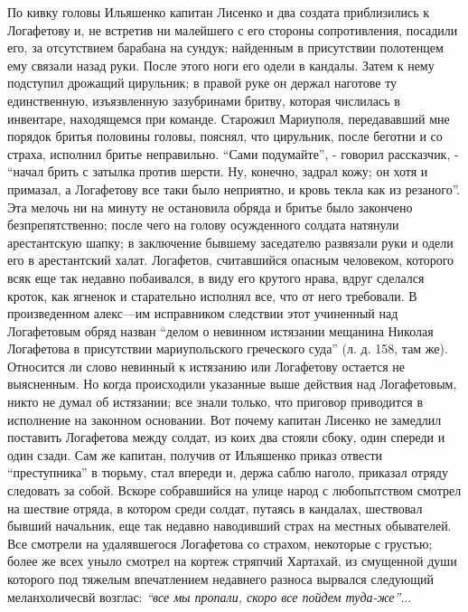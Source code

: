 \documentclass[a4paper,20pt]{report}
\begin{document}
По кивку головы Ильяшенко капитан Лисенко и два
создата приблизились к Логафетову и, не встретив ни
малейшего с его стороны сопротивления, посадили его, за
отсутствием барабана на сундук; найденным в присутствии полотенцем
ему связали назад руки. После этого
ноги его одели в кандалы. Затем к нему подступил
дрожащий цирульник; в правой руке он держал наготове 
ту единственную, изъязвленную зазубринами бритву,
которая числилась в инвентаре, находящемся при команде.
Старожил Мариуполя, передававший мне порядок бритья
половины головы, пояснял, что цирульник, после беготни
и со страха, исполнил бритье неправильно. 
``Сами подумайте'', - говорил рассказчик, -  ``начал брить с затылка
против шерсти. Ну, конечно, задрал кожу; он хотя и
примазал, а Логафетову все таки было неприятно, и кровь
текла как из резаного''. Эта мелочь ни на минуту не
остановила обряда и бритье было закончено безпрепятственно;
после чего на голову осужденного солдата натянули арестантскую шапку; 
в заключение бывшему заседателю развязали руки и одели его в арестантский халат. Логафетов,
считавшийся опасным человеком, которого всяк еще так
недавно побаивался, в виду его крутого нрава, вдруг сделался
кроток, как ягненок и старательно исполнял все,
что от него требовали. В произведенном алекс—им исправником 
следствии этот учиненный над Логафетовым
обряд назван ``делом о невинном истязании мещанина
Николая Логафетова в присутствии мариупольского греческого
суда'' (л. д. 158, там же). Относится ли слово невинный
к истязанию или Логафетову остается не выясненным. Но
когда происходили указанные выше действия над Логафетовым, 
никто не думал об истязании; все знали только,
что приговор приводится в исполнение на законном основании. 
Вот почему капитан Лисенко не замедлил поставить Логафетова между солдат, из коих два стояли
сбоку, один спереди и один сзади. 
Сам же капитан, получив от Ильяшенко приказ отвести ``преступника'' в
тюрьму, стал впереди и, держа саблю наголо, приказал
отряду следовать за собой. Вскоре собравшийся на улице
народ с любопытством смотрел на шествие отряда, в
котором среди солдат, путаясь в кандалах, шествовал
бывший начальник, еще так недавно наводивший страх
на местных обывателей. Все смотрели на удалявшегося Логафетова со страхом,
некоторые с грустью; более же всех
уныло смотрел на кортеж стряпчий Хартахай, из смущенной души которого 
под тяжелым впечатлением недавнего
разноса вырвался следующий меланхоличесвй возглас: \emph{``все
мы пропали, скоро все пойдем туда-же''}...
\end{document}
